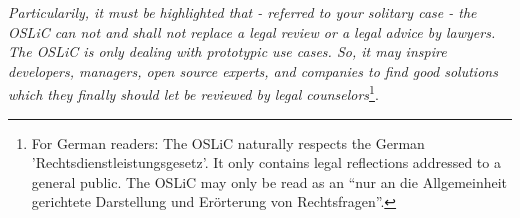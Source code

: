 \textit{Particularily, it must be highlighted that - referred to your solitary
case - the OSLiC can not and shall not replace a legal review or a legal advice
by lawyers. The OSLiC is only dealing with prototypic use cases. So, it may
inspire developers, managers, open source experts, and companies to find good
solutions which they finally should let be reviewed by legal
counselors}\footnote{For German readers: The OSLiC naturally respects the German
'Rechtsdienstleistungsgesetz'. It only contains legal reflections addressed to a
general public. The OSLiC may only be read as an \enquote{nur an die
Allgemeinheit gerichtete Darstellung und Erörterung von Rechtsfragen}.}.



